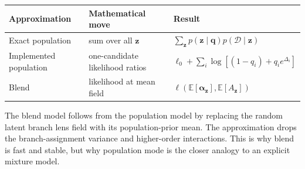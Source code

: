 \documentclass[11pt]{article}
\newcommand{\data}{\mathcal{D}}
\newcommand{\E}{\mathbb{E}}
\begin{document}
\begin{center}
\begin{tabular}{lll}
\toprule
Approximation & Mathematical move & Result\\
\midrule
Exact population &
sum over all $\bm{z}$ &
$\sum_{\bm{z}}p(\bm{z}\mid\bm{q})p(\data\mid\bm{z})$\\
Implemented population &
one-candidate likelihood ratios &
$\ell_0+\sum_i\log[(1-q_i)+q_i e^{\Delta_i}]$\\
Blend &
likelihood at mean field &
$\ell(\E[\bm{\alpha}_{\bm{z}}],\E[A_{\bm{z}}])$\\
\bottomrule
\end{tabular}
\end{center}

The blend model follows from the population model by replacing the random
latent branch lens field with its population-prior mean. The approximation
drops the branch-assignment variance and higher-order interactions. This is
why blend is fast and stable, but why population mode is the closer analogy to
an explicit mixture model.
\end{document}
